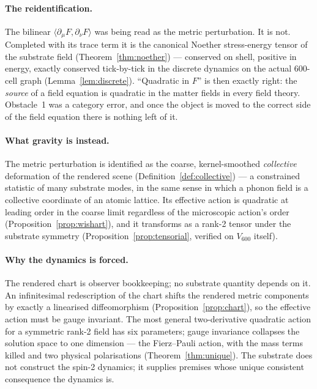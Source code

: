 \documentclass[12pt]{article}
\theoremstyle{definition}
\theoremstyle{remark}
\begin{document}
\paragraph{The reidentification.} The bilinear $\langle\partial_\mu F, \partial_\nu F\rangle$ was being read as the metric perturbation. It is not. Completed with its trace term it is the canonical Noether stress-energy tensor of the substrate field (Theorem~\ref{thm:noether}) --- conserved on shell, positive in energy, exactly conserved tick-by-tick in the discrete dynamics on the actual 600-cell graph (Lemma~\ref{lem:discrete}). ``Quadratic in $F$'' is then exactly right: the \emph{source} of a field equation is quadratic in the matter fields in every field theory. Obstacle~1 was a category error, and once the object is moved to the correct side of the field equation there is nothing left of it.

\paragraph{What gravity is instead.} The metric perturbation is identified as the coarse, kernel-smoothed \emph{collective} deformation of the rendered scene (Definition~\ref{def:collective}) --- a constrained statistic of many substrate modes, in the same sense in which a phonon field is a collective coordinate of an atomic lattice. Its effective action is quadratic at leading order in the coarse limit regardless of the microscopic action's order (Proposition~\ref{prop:wishart}), and it transforms as a rank-2 tensor under the substrate symmetry (Proposition~\ref{prop:tensorial}, verified on $V_{600}$ itself).

\paragraph{Why the dynamics is forced.} The rendered chart is observer bookkeeping; no substrate quantity depends on it. An infinitesimal redescription of the chart shifts the rendered metric components by exactly a linearised diffeomorphism (Proposition~\ref{prop:chart}), so the effective action must be gauge invariant. The most general two-derivative quadratic action for a symmetric rank-2 field has six parameters; gauge invariance collapses the solution space to one dimension --- the Fierz--Pauli action, with the mass terms killed and two physical polarisations (Theorem~\ref{thm:unique}). The substrate does not construct the spin-2 dynamics; it supplies premises whose unique consistent consequence the dynamics is.
\end{document}
